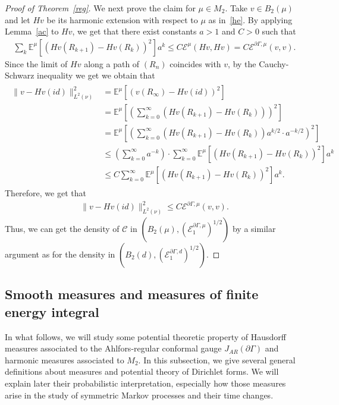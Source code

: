 \documentclass[10pt]{amsart}
\theoremstyle{definition}\newtheorem{defi}[theo]{Definition}\newtheorem{rema}[theo]{Remark}\newtheorem{exam}[theo]{Example}\newtheorem{exem}[theo]{Example}\newtheorem{nota}[theo]{Notation}
\newcommand{\ce}{\mathcal{E}}
\newcommand{\cC}{\mathcal{C}}
\newcommand{\be}{\mathbb{E}}
\begin{document}
\begin{proof}[{Proof of Theorem~\ref{reg}}]
We next prove the claim for $\mu\in M_2$. Take $v\in B_2(\mu)$ and let $Hv$ be its harmonic extension with respect to $\mu$ as in~\eqref{he}. By applying Lemma~\ref{ac} to $Hv$, we get that there exist constants $a>1$ and $C>0$ such that
\begin{align*}
\sum_k\be^{\mu}\left[\left(Hv(R_{k+1})-Hv(R_k)\right)^2\right]a^k\leq C\ce^\mu(Hv,Hv)=C \ce^{\partial\Gamma,\mu}(v,v).
\end{align*}
Since the limit of $Hv$ along a path of $(R_n)$ coincides with $v$, by the Cauchy-Schwarz inequality we get we obtain that
\begin{align}\label{cs-ineq}
\begin{split}
\|v-Hv(id)\|_{L^2(\nu)}^2 &=\be^{\mu}\left[\left(v(R_{\infty})-Hv(id)\right)^2\right]
\\
&=\be^{\mu}\left[\left(\sum_{k=0}^{\infty}\left(Hv(R_{k+1})-Hv(R_k)\right)\right)^2\right]\\
&=\be^{\mu}\left[\left(\sum_{k=0}^{\infty}\left(Hv(R_{k+1})-Hv(R_k)\right)a^{k/2}\cdot a^{-k/2}\right)^2\right]
\\
&\leq \left(\sum_{k=0}^{\infty}a^{-k}\right)\cdot\sum_{k=0}^{\infty}\be^{\mu}\left[\left(Hv(R_{k+1})-Hv(R_k)\right)^2\right]a^k
\\
&\leq C \sum_{k=0}^{\infty}\be^{\mu}\left[\left(Hv(R_{k+1})-Hv(R_k)\right)^2\right]a^k.
\end{split}
\end{align}
Therefore, we get that
\begin{align}\label{nu}
\|v-Hv(id)\|_{L^2(\nu)}^2\leq C\ce^{\partial\Gamma,\mu}(v,v).
\end{align}
Thus, we can get the density of $\cC$ in $(B_{2}(\mu),(\ce^{\partial\Gamma,\mu}_1)^{1/2})$ by a similar argument as for the density in $(B_2(d), (\ce^{\partial\Gamma,d}_1)^{1/2})$.
\end{proof}

\subsection{Smooth measures and measures of finite energy integral}
In what follows, we will study some potential theoretic property of Hausdorff measures associated to the Ahlfors-regular conformal gauge $J_{AR}(\partial\Gamma)$ and harmonic measures associated to $M_2$. In this subsection, we give several general definitions about measures and potential theory of Dirichlet forms. We will explain later their probabilistic interpretation, especially how those measures arise in the study of symmetric Markov processes and their time changes.
\end{document}
